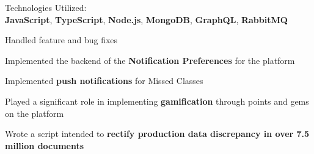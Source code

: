\documentclass[]{deedy-resume-openfont}
\begin{document}
\begin{minipage}[t]{0.66\textwidth}

\sectionsep
\begin{tightemize}
\item Technologies Utilized: \\\textbf{JavaScript}, \textbf{TypeScript}, \textbf{Node.js}, \textbf{MongoDB}, \textbf{GraphQL}, \textbf{RabbitMQ}
\item Handled feature and bug fixes
\item Implemented the backend of the \textbf{Notification Preferences} for the platform
\item Implemented \textbf{push notifications} for Missed Classes
\item Played a significant role in implementing \textbf{gamification} through points and gems on the platform
\item Wrote a script intended to \textbf{rectify production data discrepancy in over 7.5 million documents}
\end{tightemize}






\end{minipage}
\end{document}
